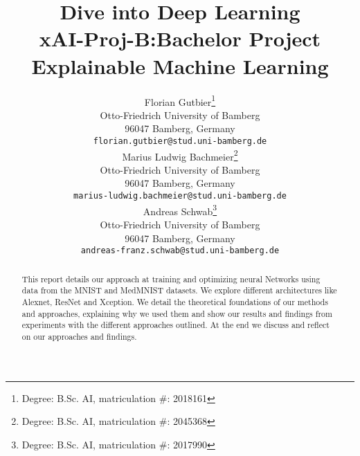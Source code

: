 \documentclass[a4paper]{article}
\title{ Dive into Deep Learning\\ {\large xAI-Proj-B:\@ Bachelor Project Explainable Machine Learning }}
\author{%
  Florian Gutbier\thanks{Degree: B.Sc. AI, matriculation \#: 2018161} \\
  Otto-Friedrich University of Bamberg\\
  96047 Bamberg, Germany\\
  \texttt{florian.gutbier@stud.uni-bamberg.de}\\
   \And
   Marius Ludwig Bachmeier\thanks{Degree: B.Sc. AI, matriculation \#: 2045368}\\
   Otto-Friedrich University of Bamberg\\
   96047 Bamberg, Germany\\
   \texttt{marius-ludwig.bachmeier@stud.uni-bamberg.de} \\
   \And
   Andreas Schwab\thanks{Degree: B.Sc. AI, matriculation \#: 2017990}\\
   Otto-Friedrich University of Bamberg\\
   96047 Bamberg, Germany\\
   \texttt{andreas-franz.schwab@stud.uni-bamberg.de} \\
}
\begin{document}
\maketitle
\def\va{{\bm{a}}}

\begin{abstract}
This report details our approach at training and optimizing neural Networks using data from the MNIST and MedMNIST datasets. We explore different architectures like Alexnet, ResNet and Xception. We detail the theoretical foundations of our methods and approaches, explaining why we used them and show our results and findings from experiments with the different approaches outlined. At the end we discuss and reflect on our approaches and findings.
\end{abstract}











%






\end{document}
